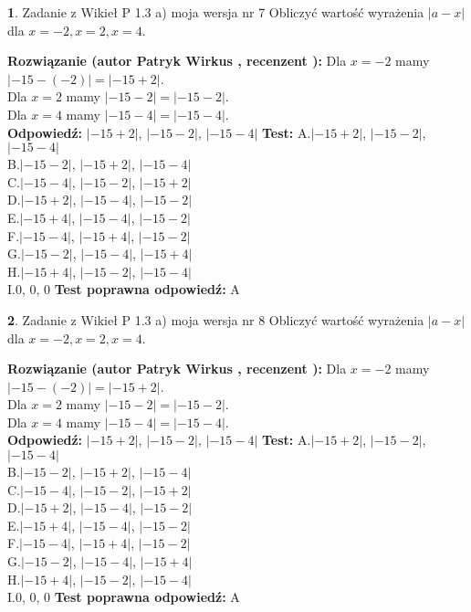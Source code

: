\documentclass[12pt, a4paper]{article}
\theoremstyle{definition} %
\newtheorem{zad}{}
\newcommand{\zadStart}[1]{\begin{zad}#1\newline}
\newcommand{\zadStop}{\end{zad}}
\newcommand{\rozwStart}[2]{\noindent \textbf{Rozwiązanie (autor #1 , recenzent #2): }\newline}
\newcommand{\rozwStop}{\newline}
\newcommand{\odpStart}{\noindent \textbf{Odpowiedź:}\newline}
\newcommand{\odpStop}{\newline}
\newcommand{\testStart}{\noindent \textbf{Test:}\newline}
\newcommand{\testStop}{\newline}
\newcommand{\kluczStart}{\noindent \textbf{Test poprawna odpowiedź:}\newline}
\newcommand{\kluczStop}{\newline}
\begin{document}
\zadStart{Zadanie z Wikieł P 1.3 a) moja wersja nr 7}
Obliczyć wartość wyrażenia $|a - x|$ dla $x=-2,x=2,x=4$.
\zadStop
\rozwStart{Patryk Wirkus}{}
Dla $x = -2$ mamy $|-15 - (-2)| = |-15 + 2|$.\\
Dla $x = 2$ mamy $|-15 - 2| = |-15 - 2|$.\\
Dla $x = 4$ mamy $|-15 - 4| = |-15 - 4|$.\\
\rozwStop
\odpStart
$|-15 + 2|$, $|-15 - 2|$, $|-15 - 4|$
\odpStop
\testStart
A.$|-15 + 2|$, $|-15 - 2|$, $|-15 - 4|$\\
B.$|-15 - 2|$, $|-15 + 2|$, $|-15 - 4|$\\
C.$|-15 - 4|$, $|-15 - 2|$, $|-15 + 2|$\\
D.$|-15 + 2|$, $|-15 - 4|$, $|-15 - 2|$\\
E.$|-15 + 4|$, $|-15 - 4|$, $|-15 - 2|$\\
F.$|-15 - 4|$, $|-15 + 4|$, $|-15 - 2|$\\
G.$|-15 - 2|$, $|-15 - 4|$, $|-15 + 4|$\\
H.$|-15 + 4|$, $|-15 - 2|$, $|-15 - 4|$\\
I.$0$, $0$, $0$
\testStop
\kluczStart
A
\kluczStop



\zadStart{Zadanie z Wikieł P 1.3 a) moja wersja nr 8}
Obliczyć wartość wyrażenia $|a - x|$ dla $x=-2,x=2,x=4$.
\zadStop
\rozwStart{Patryk Wirkus}{}
Dla $x = -2$ mamy $|-15 - (-2)| = |-15 + 2|$.\\
Dla $x = 2$ mamy $|-15 - 2| = |-15 - 2|$.\\
Dla $x = 4$ mamy $|-15 - 4| = |-15 - 4|$.\\
\rozwStop
\odpStart
$|-15 + 2|$, $|-15 - 2|$, $|-15 - 4|$
\odpStop
\testStart
A.$|-15 + 2|$, $|-15 - 2|$, $|-15 - 4|$\\
B.$|-15 - 2|$, $|-15 + 2|$, $|-15 - 4|$\\
C.$|-15 - 4|$, $|-15 - 2|$, $|-15 + 2|$\\
D.$|-15 + 2|$, $|-15 - 4|$, $|-15 - 2|$\\
E.$|-15 + 4|$, $|-15 - 4|$, $|-15 - 2|$\\
F.$|-15 - 4|$, $|-15 + 4|$, $|-15 - 2|$\\
G.$|-15 - 2|$, $|-15 - 4|$, $|-15 + 4|$\\
H.$|-15 + 4|$, $|-15 - 2|$, $|-15 - 4|$\\
I.$0$, $0$, $0$
\testStop
\kluczStart
A
\kluczStop
\end{document}
